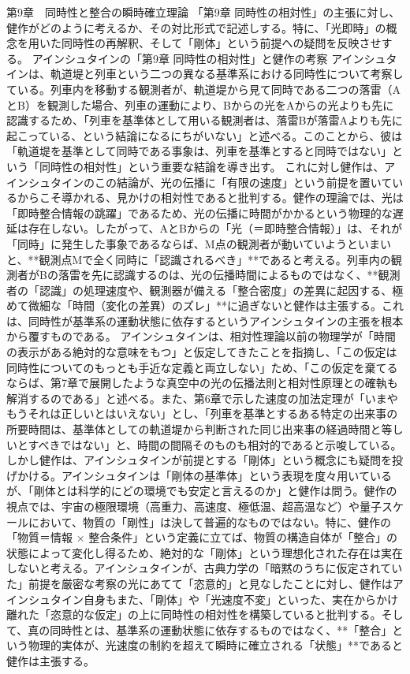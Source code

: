 \documentclass{article}
\begin{document}
第9章　同時性と整合の瞬時確立理論
「第9章 同時性の相対性」の主張に対し、健作がどのように考えるか、その対比形式で記述しする。特に、「光即時」の概念を用いた同時性の再解釈、そして「剛体」という前提への疑問を反映させする。
アインシュタインの「第9章 同時性の相対性」と健作の考察
アインシュタインは、軌道堤と列車という二つの異なる基準系における同時性について考察している。列車内を移動する観測者が、軌道堤から見て同時である二つの落雷（AとB）を観測した場合、列車の運動により、Bからの光をAからの光よりも先に認識するため、「列車を基準体として用いる観測者は、落雷Bが落雷Aよりも先に起こっている、という結論になるにちがいない」と述べる。このことから、彼は「軌道堤を基準として同時である事象は、列車を基準とすると同時ではない」という「同時性の相対性」という重要な結論を導き出す。
これに対し健作は、アインシュタインのこの結論が、光の伝播に「有限の速度」という前提を置いているからこそ導かれる、見かけの相対性であると批判する。健作の理論では、光は「即時整合情報の跳躍」であるため、光の伝播に時間がかかるという物理的な遅延は存在しない。したがって、AとBからの「光（＝即時整合情報）」は、それが「同時」に発生した事象であるならば、M点の観測者が動いていようといまいと、**観測点Mで全く同時に「認識されるべき」**であると考える。列車内の観測者がBの落雷を先に認識するのは、光の伝播時間によるものではなく、**観測者の「認識」の処理速度や、観測器が備える「整合密度」の差異に起因する、極めて微細な「時間（変化の差異）のズレ」**に過ぎないと健作は主張する。これは、同時性が基準系の運動状態に依存するというアインシュタインの主張を根本から覆すものである。
アインシュタインは、相対性理論以前の物理学が「時間の表示がある絶対的な意味をもつ」と仮定してきたことを指摘し、「この仮定は同時性についてのもっとも手近な定義と両立しない」ため、「この仮定を棄てるならば、第7章で展開したような真空中の光の伝播法則と相対性原理との確執も解消するのである」と述べる。また、第6章で示した速度の加法定理が「いまやもうそれは正しいとはいえない」とし、「列車を基準とするある特定の出来事の所要時間は、基準体としての軌道堤から判断された同じ出来事の経過時間と等しいとすべきではない」と、時間の間隔そのものも相対的であると示唆している。
しかし健作は、アインシュタインが前提とする「剛体」という概念にも疑問を投げかける。アインシュタインは「剛体の基準体」という表現を度々用いているが、「剛体とは科学的にどの環境でも安定と言えるのか」と健作は問う。健作の視点では、宇宙の極限環境（高重力、高速度、極低温、超高温など）や量子スケールにおいて、物質の「剛性」は決して普遍的なものではない。特に、健作の「物質＝情報 × 整合条件」という定義に立てば、物質の構造自体が「整合」の状態によって変化し得るため、絶対的な「剛体」という理想化された存在は実在しないと考える。アインシュタインが、古典力学の「暗黙のうちに仮定されていた」前提を厳密な考察の光にあてて「恣意的」と見なしたことに対し、健作はアインシュタイン自身もまた、「剛体」や「光速度不変」といった、実在からかけ離れた「恣意的な仮定」の上に同時性の相対性を構築していると批判する。そして、真の同時性とは、基準系の運動状態に依存するものではなく、**「整合」という物理的実体が、光速度の制約を超えて瞬時に確立される「状態」**であると健作は主張する。
\end{document}

